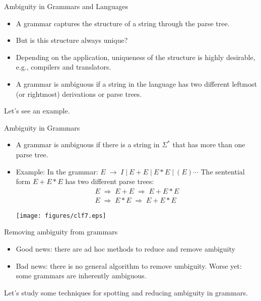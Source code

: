 \documentclass{prosper}%
\newcommand{\ra}{\mbox{$\;\rightarrow\;$}}
\newcommand{\vb}{\mbox{$\;|\:$}}
\newcommand{\dra}{\mbox{$\;\Rightarrow\;$}}
\begin{document}
\begin{slide}{Ambiguity in Grammars and Languages}
\begin{itemize}
\item A grammar captures the structure of a string through the  parse tree.
\item But is this structure always unique?
\item Depending on the application, uniqueness of the structure is highly desirable, e.g., compilers and translators.
\item A grammar is ambiguous if a  string in the language has two different leftmost (or rightmost) derivations or parse trees.
\end{itemize}
Let's see an example.
\end{slide}

\begin{slide}{Ambiguity in Grammars}
\begin{itemize}
\item A grammar  is ambiguous if there is a string in $\Sigma^*$ that has more than one parse tree. 
\item Example: In the grammar:
\(
E\ra I \vb E+E \vb E*E \vb (E)\cdots
\)
The sentential form {\blue\bf $E+E*E$} has two different {parse trees}:
\[
\begin{array}{l}
E\dra E+E \dra E+E*E\\
E\dra E*E \dra E+E*E
\end{array}
\]
\begin{center}
\texttt{[image: figures/clf7.eps]}
\end{center}
\end{itemize}
\end{slide}

\begin{slide}{Removing ambiguity from grammars}
\begin{itemize}
\item Good news: there are ad hoc methods to reduce and remove ambiguity
\item Bad news: there is no general algorithm to remove umbiguity. Worse yet: some grammars are inherently ambiguous.
\end{itemize}
Let's study some techniques for spotting and reducing ambiguity in grammars.
\end{slide}
\end{document}

